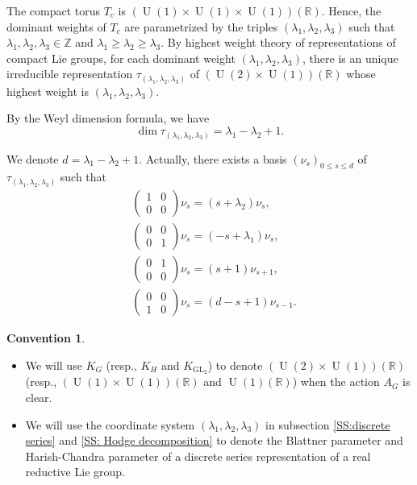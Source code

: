 \documentclass[11pt, a4paper]{amsart}
\theoremstyle{plain}
\theoremstyle{definition}
\newtheorem{convention}[theorem]{Convention}
\numberwithin{equation}{section}
\def\RR{\mathbb{R}}
\def\ZZ{\mathbb{Z}}
\DeclareMathOperator{\GL}{\mathrm{GL}}
\DeclareMathOperator{\U}{\mathrm{U}}
\begin{document}
\par The compact torus $T_c$ is $(\U(1) \times \U(1) \times \U(1))(\RR)$. Hence, the dominant weights of $T_c$ are parametrized by the triples $(\lambda_1, \lambda_2, \lambda_3)$ such that $\lambda_1, \lambda_2, \lambda_3 \in \ZZ$ and $\lambda_1 \ge \lambda_2 \ge \lambda_3$. By highest weight theory of representations of compact Lie groups, for each dominant weight $(\lambda_1, \lambda_2, \lambda_3)$, there is an unique irreducible representation $\tau_{(\lambda_1, \lambda_2, \lambda_3)}$ of $(\U(2) \times \U(1))(\RR)$ whose highest weight is $(\lambda_1, \lambda_2, \lambda_3)$. 

By the Weyl dimension formula, we have 
\begin{equation*}
    \dim \tau_{(\lambda_1, \lambda_2, \lambda_3)} = \lambda_1 - \lambda_2 + 1. 
\end{equation*}

We denote $d = \lambda_1 - \lambda_2 + 1$. 
Actually, there exists a basis $(\nu_s)_{0 \le s \le d}$ of $\tau_{(\lambda_1, \lambda_2, \lambda_3)}$ such that 
\begin{align}
\label{eqn: action on K-type}
    & \left( \begin{matrix}
                1 & 0 \\
                0 & 0 
             \end{matrix} \right) \nu_s = (s + \lambda_2) \nu_s, \\
     & \left( \begin{matrix}
                0 & 0 \\
                0 & 1 
             \end{matrix} \right) \nu_s = (-s + \lambda_1) \nu_s, \\ 
      & \left( \begin{matrix}
                0 & 1 \\
                0 & 0 
             \end{matrix} \right) \nu_s = (s + 1) \nu_{s + 1}, \\ 
      & \left( \begin{matrix}
                0 & 0 \\
                1 & 0 
             \end{matrix} \right) \nu_s = (d - s + 1) \nu_{s - 1}.   
\end{align}

\begin{convention}
    \begin{itemize}
        \item We will use $K_{G}$ (resp., $K_{H}$ and $K_{\GL_{2}}$) to denote $(\U(2) \times \U(1))(\RR)$ (resp., $(\U(1) \times \U(1))(\RR)$ and $\U(1)(\RR)$) when the action $A_{G}$ is clear.
        \item We will use the coordinate system $(\lambda_1, \lambda_2, \lambda_3)$ in subsection \ref{SS:discrete series} and \ref{SS: Hodge decomposition} to denote the Blattner parameter and Harish-Chandra parameter of a discrete series representation of a real reductive Lie group. 
    \end{itemize}
\end{convention}
\end{document}
